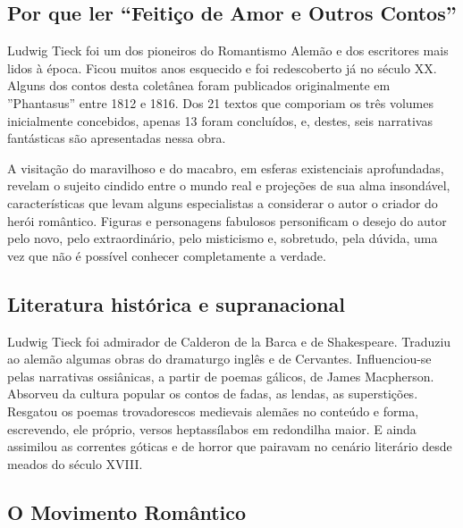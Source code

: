 \documentclass[11pt]{extarticle}
\begin{document}
\subsection{Por que ler ``Feitiço de Amor e Outros Contos''}

Ludwig Tieck foi um dos pioneiros do Romantismo Alemão e dos escritores
mais lidos à época. Ficou muitos anos esquecido e foi redescoberto já no
século XX. Alguns dos contos desta coletânea foram publicados
originalmente em ''Phantasus'' entre 1812 e 1816. Dos 21 textos que
comporiam os três volumes inicialmente concebidos, apenas 13 foram
concluídos, e, destes, seis narrativas fantásticas são apresentadas
nessa obra.

A visitação do maravilhoso e do macabro, em esferas existenciais
aprofundadas, revelam o sujeito cindido entre o mundo real e projeções
de sua alma insondável, características que levam alguns especialistas a
considerar o autor o criador do herói romântico. Figuras e personagens
fabulosos personificam o desejo do autor pelo novo, pelo extraordinário,
pelo misticismo e, sobretudo, pela dúvida, uma vez que não é possível
conhecer completamente a verdade.


\subsection{Literatura histórica e supranacional}

Ludwig Tieck foi admirador de Calderon de la Barca e de Shakespeare.
Traduziu ao alemão algumas obras do dramaturgo inglês e de Cervantes.
Influenciou-se pelas narrativas ossiânicas, a partir de poemas gálicos,
de James Macpherson. Absorveu da cultura popular os contos de fadas, as
lendas, as superstições. Resgatou os poemas trovadorescos medievais
alemães no conteúdo e forma, escrevendo, ele próprio, versos
heptassílabos em redondilha maior. E ainda assimilou as correntes
góticas e de horror que pairavam no cenário literário desde meados do
século XVIII.

\subsection{O Movimento Romântico}
\end{document}
